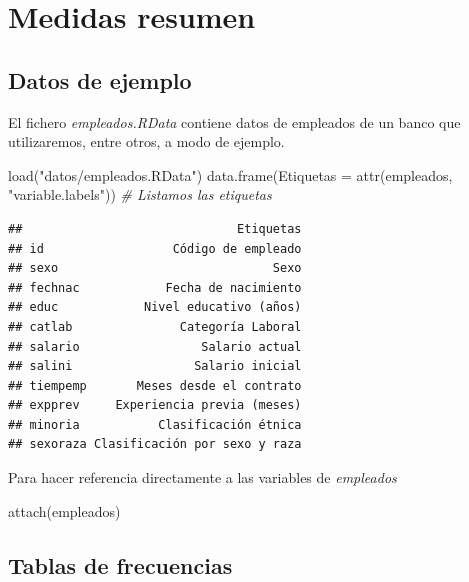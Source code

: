 \documentclass[
]{book}
\newenvironment{Shaded}{\begin{snugshade}}{\end{snugshade}}
\newcommand{\AttributeTok}[1]{\textcolor[rgb]{0.77,0.63,0.00}{#1}}
\newcommand{\CommentTok}[1]{\textcolor[rgb]{0.56,0.35,0.01}{\textit{#1}}}
\newcommand{\FunctionTok}[1]{\textcolor[rgb]{0.00,0.00,0.00}{#1}}
\newcommand{\NormalTok}[1]{#1}
\newcommand{\StringTok}[1]{\textcolor[rgb]{0.31,0.60,0.02}{#1}}
\theoremstyle{break}
\begin{document}
\hypertarget{medidas-resumen}{%
\section{Medidas resumen}\label{medidas-resumen}}

\hypertarget{datos-de-ejemplo}{%
\subsection{Datos de ejemplo}\label{datos-de-ejemplo}}

El fichero \emph{empleados.RData} contiene datos de empleados de un banco que utilizaremos,
entre otros, a modo de ejemplo.

\begin{Shaded}
\begin{Highlighting}[]
\FunctionTok{load}\NormalTok{(}\StringTok{"datos/empleados.RData"}\NormalTok{)}
\FunctionTok{data.frame}\NormalTok{(}\AttributeTok{Etiquetas =} \FunctionTok{attr}\NormalTok{(empleados, }\StringTok{"variable.labels"}\NormalTok{))  }\CommentTok{\# Listamos las etiquetas}
\end{Highlighting}
\end{Shaded}

\begin{verbatim}
##                              Etiquetas
## id                  Código de empleado
## sexo                              Sexo
## fechnac            Fecha de nacimiento
## educ            Nivel educativo (años)
## catlab               Categoría Laboral
## salario                 Salario actual
## salini                 Salario inicial
## tiempemp       Meses desde el contrato
## expprev     Experiencia previa (meses)
## minoria           Clasificación étnica
## sexoraza Clasificación por sexo y raza
\end{verbatim}

Para hacer referencia directamente a las variables de \emph{empleados}

\begin{Shaded}
\begin{Highlighting}[]
\FunctionTok{attach}\NormalTok{(empleados)}
\end{Highlighting}
\end{Shaded}

\hypertarget{tablas-de-frecuencias}{%
\subsection{Tablas de frecuencias}\label{tablas-de-frecuencias}}
\end{document}
